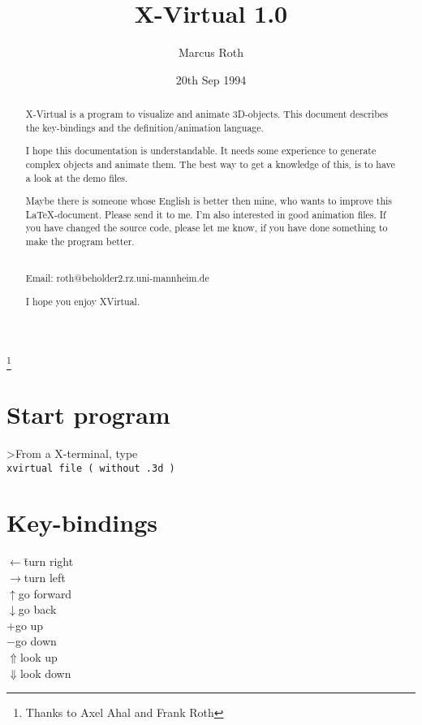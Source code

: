 %
%
%
%
\sloppy

\title{X-Virtual 1.0}
\author{Marcus Roth}
\date{20th Sep 1994}
\maketitle
\begin{abstract}
X-Virtual is a program to visualize and animate 3D-objects. This document
describes the key-bindings and the definition/animation language.

I hope this documentation is understandable. It needs some experience to
generate complex objects and animate them. The best way to get a knowledge
of this, is to have a look at the demo files.

Maybe there is someone whose English is better then mine, who wants to 
improve this \LaTeX-document. Please send it to me. I'm also interested
in good animation files. If you have changed the source code, please
let me know, if you have done something to make the program better.
\begin{tabbing}
\\
Email: roth@beholder2.rz.uni-mannheim.de\\
\end{tabbing}
I hope you enjoy XVirtual. 
\end{abstract}
\thanks{Thanks to Axel Ahal and Frank Roth}
\\
\newpage
\tableofcontents
\newpage

\section{Start program}
>From a X-terminal, type\\
\tt{xvirtual file} ( without .3d )   
 
\section{Key-bindings}
\begin{tabbing}
$\leftarrow$\=turn right\\
$\rightarrow{}$\>turn left\\
$\uparrow{}$\>go forward\\
$\downarrow{}$\>go back\\
$+$\>go up\\
$-$\>go down\\
$\Uparrow{}$\>look up\\
$\Downarrow{}$\>look down\\
\end{tabbing}
